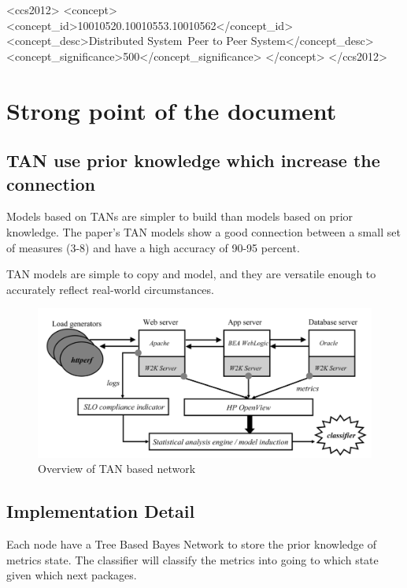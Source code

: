 \documentclass[acmlarge]{acmart}
\begin{document}
\begin{CCSXML}
  <ccs2012>
  <concept>
  <concept_id>10010520.10010553.10010562</concept_id>
  <concept_desc>Distributed System~Peer to Peer System</concept_desc>
  <concept_significance>500</concept_significance>
  </concept>
  </ccs2012>
\end{CCSXML}

\ccsdesc[500]{}



\maketitle
\section{Strong point of the document}

\subsection{TAN use prior knowledge which increase the connection}
Models based on TANs are simpler to build than models based on prior knowledge. The paper's TAN models show a good connection between a small set of measures (3-8) and have a high accuracy of 90-95 percent.

TAN models are simple to copy and model, and they are versatile enough to accurately reflect real-world circumstances.

\begin{figure}[htbp]
  \centering
  \includegraphics[width=0.3\columnwidth]{./overview.png}
  \caption{Overview of TAN based network \cite{cohen2004correlating}}
\end{figure}

\subsection{Implementation Detail}
Each node have a Tree Based Bayes Network to store the prior knowledge of metrics state. The classifier will classify the metrics into going to which state given which next packages.
\end{document}
